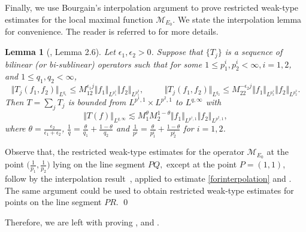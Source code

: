 \documentclass[a4paper,reqno]{amsart}
\newtheorem{lemma}{Lemma}[section]
\numberwithin{equation}{section}
\begin{document}
	Finally, we use Bourgain's interpolation argument to prove restricted weak-type estimates for the local maximal function $\mathcal M_{E_0}$. We state the interpolation lemma for convenience. The reader is referred to \cite{Lee1} for more details. 
	
	\begin{lemma}[\cite{Lee1}, Lemma 2.6]\label{Bourgain}
		Let $\epsilon_1,\epsilon_2>0$. Suppose that $\{T_j\}$ is a sequence of bilinear (or bi-sublinear) operators 
		such that for some $1\leq p_1^i,p_2^i<\infty, i=1,2$, and $1\leq q_1,q_2<\infty$, 
		$$\Vert T_{j}(f_1,f_2)\Vert_{L^{q_1}}\leq M_12^{\epsilon_1 j}\Vert f_1\Vert_{L^{p_1^1}}\Vert f_2\Vert_{L^{p_1^2}},\qquad~~\Vert T_{j}(f_1,f_2)\Vert_{L^{q_2}}\leq M_22^{-\epsilon_2 j}\Vert f_1\Vert_{L^{p_2^1}}\Vert f_2\Vert_{L^{p_2^2}}.$$
		Then $T=\sum_jT_j$ is bounded from $L^{p^1,1}\times L^{p^2,1}$ to $L^{q,\infty}$ with 
		$$\Vert T(f)\Vert_{L^{q,\infty}}\lesssim M^{\theta}_{1}M^{1-\theta}_{2}\Vert f_1\Vert_{L^{p^1,1}}\Vert f_2\Vert_{L^{p^2,1}},$$	
		where $\theta=\frac{\epsilon_2}{\epsilon_1+\epsilon_2}$, $\frac{1}{q}=\frac{\theta}{q_1}+\frac{1-\theta}{q_2}$ 
		and $\frac{1}{p^i}=\frac{\theta}{p_1^i}+\frac{1-\theta}{p_2^i}$ for $i=1,2$.
	\end{lemma}
	Observe that, the restricted weak-type estimates for the operator $\mathcal{M}_{E_0}$ at  the point $\big(\frac{1}{p_1},\frac{1}{p_2}\big)$ lying on the line segment $PQ,$ except at the point $P=(1,1)$, follow 
	by the interpolation result~, applied to estimate \eqref{forinterpolation} and  . The same argument could be used to obtain restricted weak-type estimates for points on the line segment $PR$. \qed
	\fi
	
	Therefore, we are left with proving ,  and .
\end{document}
